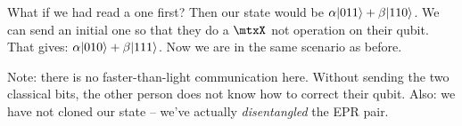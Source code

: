 \begin{remark}
  What if we had read a one first? Then our state would be $\alpha
  |011\rangle + \beta |110\rangle$. We can send an initial one so that they do a
  $\mtxX$ not operation on their qubit. That gives: $\alpha |010\rangle +
  \beta |111\rangle$. Now we are in the same scenario as before.
\end{remark}

\begin{remark}
  Note: there is no faster-than-light communication here. Without
  sending the two classical bits, the other person does not know how to
  correct their qubit. Also: we have not cloned our state -- we've
  actually \emph{disentangled} the EPR pair.
\end{remark}
